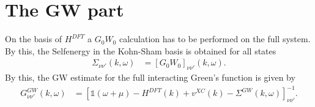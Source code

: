\documentclass[12pt,a4paper]{scrartcl}
\numberwithin{equation}{section}
\newcommand{\GF}{Green's function}
\newcommand{\unity}{\mathds{1}}
\begin{document}


\section{The GW part}

On the basis of $H^{DFT}$ a $G_0W_0$ calculation has to be performed on the full
system. By this, the Selfenergy in the Kohn-Sham basis is obtained for all states
\begin{align}
 \Sigma_{\nu\nu'}(k,\omega)
 &= \left[ G_0W_0  \right]_{\nu\nu'}(k,\omega).
\end{align}
By this, the GW estimate for the full interacting {\GF} is given by
\begin{align}
 G^{GW}_{\nu\nu'}(k,\omega) 
 &= \left[ \unity(\omega +\mu ) -H^{DFT}(k)+v^{XC}(k) - \Sigma^{GW}(k,\omega)  \right]^{-1}_{\nu\nu'}.
\end{align}
\end{document}

